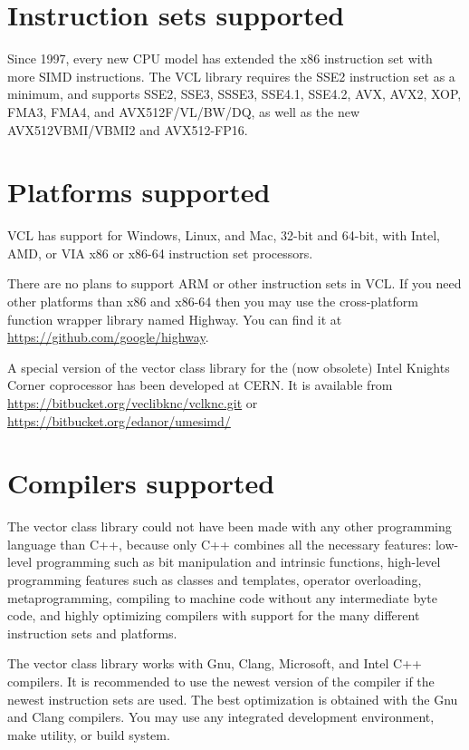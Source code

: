 \documentclass[vcl_manual.tex]{subfiles}
\begin{document}
\section{Instruction sets supported} \label{InstructionSetsSupported}
Since 1997, every new CPU model has extended the x86 instruction set with more SIMD instructions. The VCL library requires the SSE2 instruction set as a minimum, and supports SSE2, SSE3, SSSE3, SSE4.1, SSE4.2, AVX, AVX2, XOP, FMA3, FMA4, and AVX512F/VL/BW/DQ, as well as the new AVX512VBMI/VBMI2 and AVX512-FP16.

\section{Platforms supported} \label{PlatformsSupported}
VCL has support for Windows, Linux, and Mac, 32-bit and 64-bit, with Intel, AMD, or VIA x86 or x86-64 instruction set processors. 

There are no plans to support ARM or other instruction sets in VCL. If you need other platforms than x86 and x86-64 then you may use the cross-platform function wrapper library named Highway. You can find it at \url{https://github.com/google/highway}.

A special version of the vector class library for the (now obsolete) Intel Knights Corner coprocessor has been developed at CERN. It is available from
\url{https://bitbucket.org/veclibknc/vclknc.git} or 
\url{https://bitbucket.org/edanor/umesimd/}

\section{Compilers supported} \label{CompilersSupported}
The vector class library could not have been made with any other programming language than C++, because only C++ combines all the necessary features: low-level programming such as bit manipulation and intrinsic functions, high-level programming features such as classes and templates, operator overloading, metaprogramming, compiling to machine code without any intermediate byte code, and highly optimizing compilers with support for the many different instruction sets and platforms.

The vector class library works with Gnu, Clang, Microsoft, and Intel C++ compilers. It is recommended to use the newest version of the compiler if the newest instruction sets are used. The best optimization is obtained with the Gnu and Clang compilers.  You may use any integrated development environment, make utility, or build system.
\end{document}
